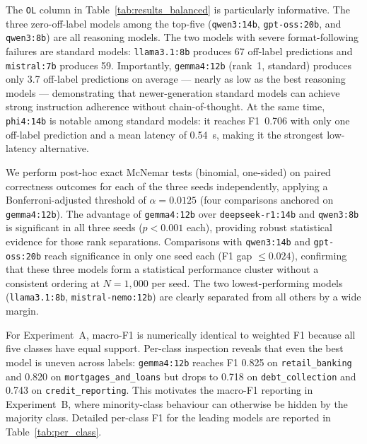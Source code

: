 \documentclass[journal]{IEEEtran}
\begin{document}
The \texttt{OL} column in Table~\ref{tab:results_balanced} is
particularly informative. The three zero-off-label models among
the top-five (\texttt{qwen3:14b}, \texttt{gpt-oss:20b}, and
\texttt{qwen3:8b}) are all reasoning models. The two models
with severe format-following failures are standard models:
\texttt{llama3.1:8b} produces 67 off-label predictions and
\texttt{mistral:7b} produces 59. Importantly, \texttt{gemma4:12b}
(rank~1, standard) produces only 3.7 off-label predictions on average
— nearly as low as the best reasoning models — demonstrating
that newer-generation standard models can achieve strong instruction
adherence without chain-of-thought. At the same time, \texttt{phi4:14b}
is notable among standard models: it reaches F1~0.706 with only one
off-label prediction and a mean latency of 0.54~s, making it the
strongest low-latency alternative.

We perform post-hoc exact McNemar tests (binomial, one-sided) on
paired correctness outcomes for each of the three seeds independently,
applying a Bonferroni-adjusted threshold of $\alpha{=}0.0125$ (four
comparisons anchored on \texttt{gemma4:12b}).
The advantage of \texttt{gemma4:12b} over \texttt{deepseek-r1:14b} and
\texttt{qwen3:8b} is significant in all three seeds ($p{<}0.001$ each),
providing robust statistical evidence for those rank separations.
Comparisons with \texttt{qwen3:14b} and \texttt{gpt-oss:20b} reach
significance in only one seed each (F1 gap $\leq 0.024$), confirming
that these three models form a statistical performance cluster without
a consistent ordering at $N{=}1{,}000$ per seed. The two lowest-performing
models (\texttt{llama3.1:8b}, \texttt{mistral-nemo:12b}) are clearly
separated from all others by a wide margin.

For Experiment~A, macro-F1 is numerically identical to weighted F1
because all five classes have equal support. Per-class inspection
reveals that even the best model is uneven across labels:
\texttt{gemma4:12b} reaches F1 0.825 on \texttt{retail\_banking} and
0.820 on \texttt{mortgages\_and\_loans} but drops to 0.718 on
\texttt{debt\_collection} and 0.743 on \texttt{credit\_reporting}.
This motivates the macro-F1 reporting in Experiment~B, where
minority-class behaviour can otherwise be hidden by the majority class.
Detailed per-class F1 for the leading models are reported in
Table~\ref{tab:per_class}.
\end{document}
